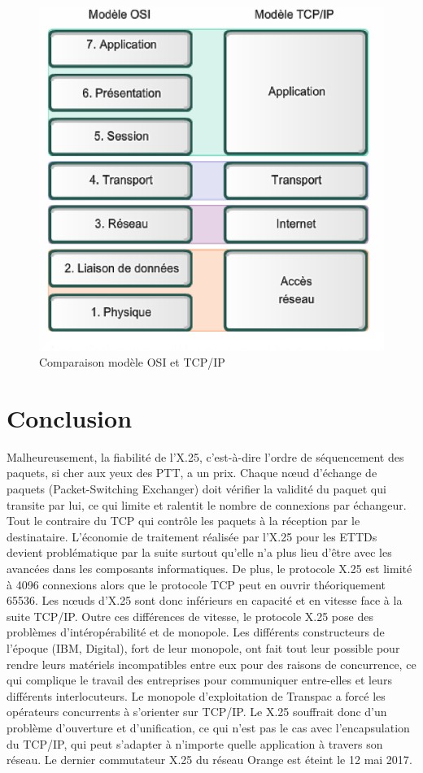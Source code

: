 \documentclass[12pt]{report}
\begin{document}
\begin{figure}[htp]
  \centering
  \includegraphics[scale=0.5]{images/osi-tcp-ip}
  \caption{Comparaison modèle OSI et TCP/IP}
  \label{fig:osi-tcp}
\end{figure}

\section{Conclusion}

Malheureusement, la fiabilité de l'X.25, c'est-à-dire l'ordre de séquencement des paquets, si cher aux yeux des PTT, a un prix.
Chaque nœud d'échange de paquets (Packet-Switching Exchanger) doit vérifier la validité du paquet qui
transite par lui, ce qui limite et ralentit le nombre de connexions par échangeur. Tout le contraire du TCP qui contrôle les paquets à la réception par le destinataire.
L'économie de traitement réalisée par l'X.25 pour les ETTDs devient problématique par la suite surtout qu'elle n'a plus lieu d'être avec les avancées dans les composants informatiques.
De plus, le protocole X.25 est limité à 4096 connexions alors que le protocole TCP peut en ouvrir théoriquement 65536. Les nœuds d'X.25 sont donc inférieurs en capacité et en vitesse face à la suite TCP/IP.
Outre ces différences de vitesse, le protocole X.25 pose des problèmes d'intéropérabilité et de monopole. Les différents constructeurs de l'époque (IBM, Digital), fort de leur monopole,
ont fait tout leur possible pour rendre leurs matériels incompatibles entre eux pour des raisons de concurrence, ce qui complique le travail des entreprises pour
communiquer entre-elles et leurs différents interlocuteurs\cite{gatoux}. Le monopole d'exploitation de Transpac a forcé les opérateurs concurrents à s'orienter sur TCP/IP.
Le X.25 souffrait donc d'un problème d'ouverture et d'unification, ce qui n'est pas le cas avec l'encapsulation du TCP/IP,
qui peut s'adapter à n'importe quelle application à travers son réseau. Le dernier commutateur X.25 du réseau Orange est éteint le 12 mai 2017\cite{killme}.
\end{document}
